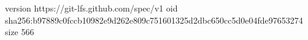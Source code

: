 version https://git-lfs.github.com/spec/v1
oid sha256:b97889c0fccb10982e9d262e809c751601325d2dbc650cc5d0e04fde97653274
size 566
